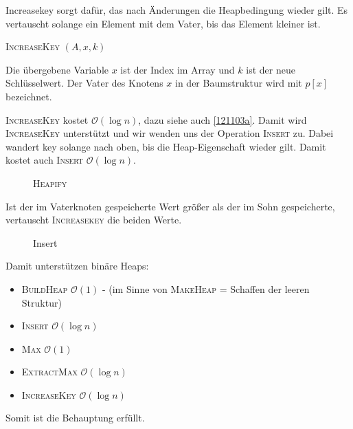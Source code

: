 \documentclass[ngerman,draft,parskip=half*,twoside]{scrreprt}
\theoremstyle{break}
\theoremstyle{nonumberbreak}
\newcommand*{\OO}{\mathcal{O}}      %
\begin{document}
Increasekey sorgt dafür, das nach Änderungen die Heapbedingung wieder gilt. Es vertauscht solange ein Element mit dem Vater, bis
das Element kleiner ist.

\begin{algorithm}
\caption{\textsc{IncreaseKey} $(A,x,k)$}
\end{algorithm}

Die übergebene Variable $x$ ist der Index im Array und $k$ ist der neue Schlüsselwert. Der Vater des Knotens $x$ in
der Baumstruktur wird mit $p[x]$ bezeichnet.

\textsc{IncreaseKey} kostet $\OO(\log n)$, dazu siehe auch \autoref{121103a}.
Damit wird \textsc{IncreaseKey} unterstützt und wir wenden uns der Operation \textsc{Insert} zu.
Dabei wandert key solange nach oben, bis die Heap-Eigenschaft wieder gilt. Damit kostet auch \textsc{Insert} $\OO(\log n)$.

\begin{figure}[H]
  \centering
  \caption{\textsc{Heapify}}
  \label{121103a}
\end{figure}
Ist der im Vaterknoten gespeicherte Wert größer als der im Sohn gespeicherte, vertauscht  \textsc{Increasekey} die beiden Werte.

\begin{figure}[H]
  \centering
  \caption{Insert}
  \label{121103b}
\end{figure}

Damit unterstützen binäre Heaps:
\begin{itemize}
\item \textsc{BuildHeap} $\OO(1)$ - (im Sinne von \textsc{MakeHeap} = Schaffen der leeren Struktur)
\item \textsc{Insert} $\OO(\log n)$
\item \textsc{Max} $\OO(1)$
\item \textsc{ExtractMax} $\OO(\log n)$
\item \textsc{IncreaseKey} $\OO(\log n)$
\end{itemize}
Somit ist die Behauptung erfüllt.
\end{document}

